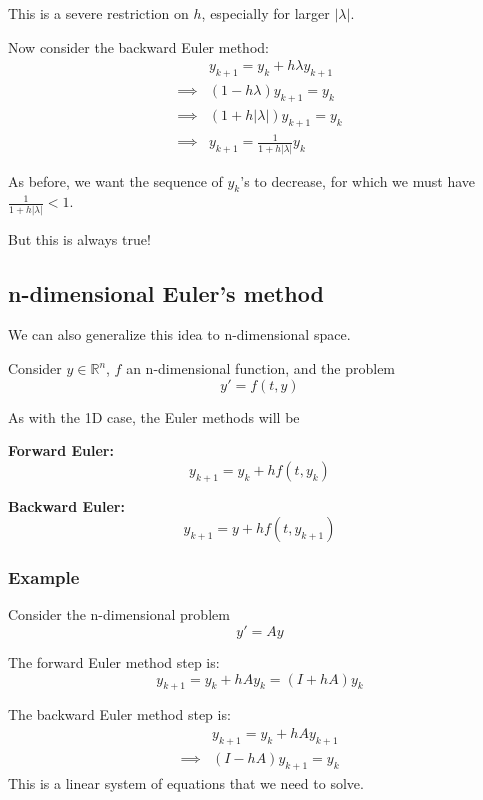 \documentclass[12pt,letterpaper]{article}
\newcommand{\R}{\mathbb{R}}
\begin{document}
This is a severe restriction on $h$, especially for larger $\lvert \lambda \rvert$.

Now consider the backward Euler method:
\begin{align}
	& y_{k+1} = y_k + h\lambda y_{k+1} \\
	\implies & (1-h\lambda)y_{k+1} = y_k \\
	\implies & (1+h\lvert \lambda \rvert)y_{k+1} = y_k \\
	\implies & y_{k+1} = \frac{1}{1+h\lvert \lambda \rvert} y_k
\end{align}

As before, we want the sequence of $y_k$'s to decrease, for which we must have $\frac{1}{1+h\lvert \lambda \rvert} < 1$.

But this is always true!

\subsection{n-dimensional Euler's method}

We can also generalize this idea to n-dimensional space.

Consider $y \in \R^n$, $f$ an n-dimensional function, and the problem
\begin{equation}
	y' = f(t,y)
\end{equation}

As with the 1D case, the Euler methods will be

\textbf{Forward Euler:}
\begin{equation}
	y_{k+1} = y_k + h f(t, y_k)
\end{equation}

\textbf{Backward Euler:}
\begin{equation}
	y_{k+1} = y + h f(t, y_{k+1})
\end{equation}

\subsubsection{Example}
Consider the n-dimensional problem
\begin{equation}
	y' = Ay
\end{equation}

The forward Euler method step is:
\begin{equation}
	y_{k+1} = y_k + hAy_k = (I+hA)y_k
\end{equation}

The backward Euler method step is:
\begin{align}
	& y_{k+1} = y_k + hAy_{k+1} \\
	\implies & (I-hA)y_{k+1} = y_k
\end{align}
This is a linear system of equations that we need to solve.
\end{document}
